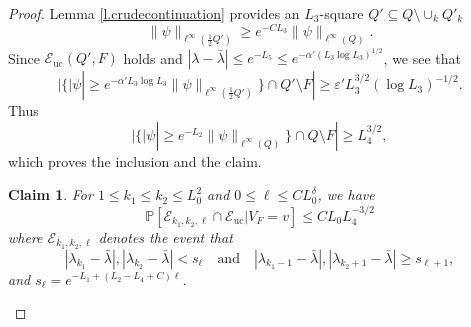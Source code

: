\documentclass{amsart}
\newtheorem{claim}[equation]{Claim}
\newcommand{\lref}[1]{Lemma \ref{l.#1}}
\numberwithin{equation}{section}
\numberwithin{figure}{section}
\renewcommand{\P}{\mathbb{P}}
\newcommand{\ep}{\varepsilon}
\begin{document}
\begin{proof}
\lref{crudecontinuation} provides an $L_3$-square $Q' \subseteq Q \setminus \cup_k Q'_k$
\begin{equation*}
\| \psi \|_{\ell^\infty(\frac12 Q')} \geq e^{-C L_3} \| \psi \|_{\ell^\infty(Q)}.
\end{equation*}
Since $\mathcal E_{\mathrm{uc}}(Q',F)$ holds and $|\lambda - \bar \lambda| \leq e^{-L_5} \leq e^{-\alpha' (L_3 \log L_3)^{1/2}}$, we see that
\begin{equation*}
|\{ |\psi| \geq e^{-\alpha' L_3 \log L_3} \| \psi \|_{\ell^\infty(\frac12 Q')} \} \cap Q' \setminus F| \geq \ep' L_3^{3/2} (\log L_3)^{-1/2}.
\end{equation*}
Thus
\begin{equation*}
|\{ |\psi| \geq e^{- L_2} \| \psi \|_{\ell^\infty(Q)} \} \cap Q \setminus F| \geq L_4^{3/2},
\end{equation*}
which proves the inclusion and the claim.

\begin{claim}
For $1 \leq k_1 \leq k_2 \leq L_0^2$ and $0 \leq \ell \leq C L_0^{\delta}$, we have
\begin{equation*}
\P[\mathcal E_{k_1,k_2,\ell} \cap \mathcal E_{\mathrm{uc}} | V_F = v] \leq C L_0 L_4^{-3/2}
\end{equation*}
where $\mathcal E_{k_1,k_2,\ell}$ denotes the event that
\begin{equation*}
|\lambda_{k_1} - \bar \lambda|, |\lambda_{k_2} - \bar \lambda| < s_\ell
\quad \mbox{and} \quad |\lambda_{k_1-1} - \bar \lambda|, |\lambda_{k_2+1} - \bar \lambda| \geq s_{\ell+1},
\end{equation*}
and $s_\ell = e^{-L_1 + (L_2 - L_4 + C) \ell}$.
\end{claim}


\end{proof}
\end{document}
